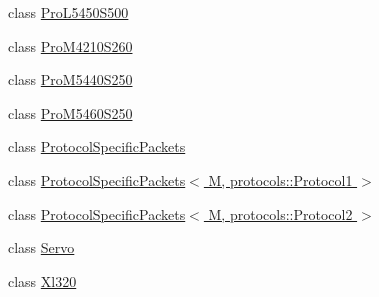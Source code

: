 \begin{DoxyCompactItemize}
\item 
class \hyperlink{classdynamixel_1_1servos_1_1_pro_l5450_s500}{Pro\+L5450\+S500}
\item 
class \hyperlink{classdynamixel_1_1servos_1_1_pro_m4210_s260}{Pro\+M4210\+S260}
\item 
class \hyperlink{classdynamixel_1_1servos_1_1_pro_m5440_s250}{Pro\+M5440\+S250}
\item 
class \hyperlink{classdynamixel_1_1servos_1_1_pro_m5460_s250}{Pro\+M5460\+S250}
\item 
class \hyperlink{classdynamixel_1_1servos_1_1_protocol_specific_packets}{Protocol\+Specific\+Packets}
\item 
class \hyperlink{classdynamixel_1_1servos_1_1_protocol_specific_packets_3_01_m_00_01protocols_1_1_protocol1_01_4}{Protocol\+Specific\+Packets$<$ M, protocols\+::\+Protocol1 $>$}
\item 
class \hyperlink{classdynamixel_1_1servos_1_1_protocol_specific_packets_3_01_m_00_01protocols_1_1_protocol2_01_4}{Protocol\+Specific\+Packets$<$ M, protocols\+::\+Protocol2 $>$}
\item 
class \hyperlink{classdynamixel_1_1servos_1_1_servo}{Servo}
\item 
class \hyperlink{classdynamixel_1_1servos_1_1_xl320}{Xl320}
\end{DoxyCompactItemize}
